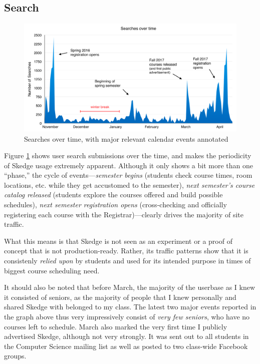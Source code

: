 \subsection{Search}

\begin{figure}[H]
  \centering

  \includegraphics[width=1.0\textwidth]{images/graph/searches}

  \caption{Searches over time, with major relevant calendar events annotated}
  \label{fig:searches}

\end{figure}

Figure \ref{fig:searches} shows user search submissions over the time, and makes the periodicity of Skedge usage extremely apparent. Although it only shows a bit more than one ``phase,'' the cycle of events---\emph{semester begins} (students check course times, room locations, etc. while they get accustomed to the semester), \emph{next semester's course catalog released} (students explore the courses offered and build possible schedules), \emph{next semester registration opens} (cross-checking and officially registering each course with the Registrar)---clearly drives the majority of site traffic.

What this means is that Skedge is not seen as an experiment or a proof of concept that is not production-ready. Rather, its traffic patterns show that it is consistenly \emph{relied upon} by students and used for its intended purpose in times of biggest course scheduling need.

It should also be noted that before March, the majority of the userbase as I knew it consisted of seniors, as the majority of people that I knew personally and shared Skedge with belonged to my class. The latest two major events reported in the graph above thus very impressively consist of \emph{very few seniors}, who have no courses left to schedule. March also marked the very first time I publicly advertised Skedge, although not very strongly. It was sent out to all students in the Computer Science mailing list as well as posted to two class-wide Facebook groups.

